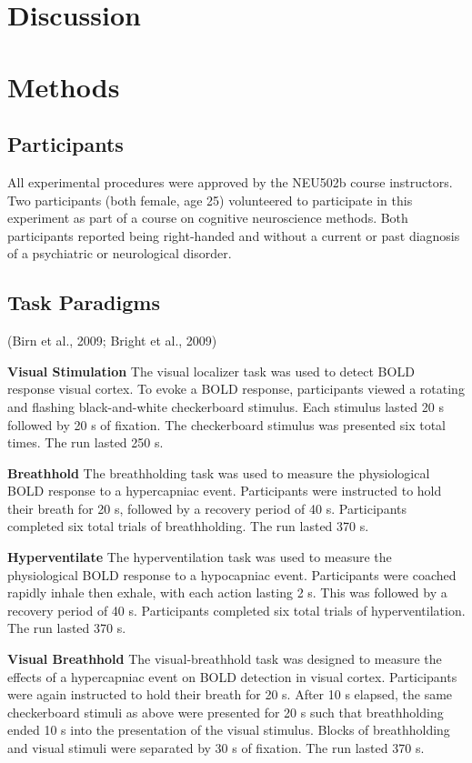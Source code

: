 \documentclass[9pt]{NEU502b-fmri}
\begin{document}
\section{Discussion}

\section{Methods}

\subsection{Participants}
All experimental procedures were approved by the NEU502b course instructors. Two participants (both female, age 25) volunteered to participate in this experiment as part of a course on cognitive neuroscience methods. Both participants reported being right-handed and without a current or past diagnosis of a psychiatric or neurological disorder.

\subsection{Task Paradigms}
(Birn et al., 2009; Bright et al., 2009) 

\textbf{Visual Stimulation} The visual localizer task was used to detect BOLD response visual cortex. To evoke a BOLD response, participants viewed a rotating and flashing black-and-white checkerboard stimulus. Each stimulus lasted 20 s followed by 20 s of fixation. The checkerboard stimulus was presented six total times. The run lasted 250 s.

\textbf{Breathhold} The breathholding task was used to measure the physiological BOLD response to a hypercapniac event. Participants were instructed to hold their breath for 20 s, followed by a recovery period of 40 s. Participants completed six total trials of breathholding. The run lasted 370 s.

\textbf{Hyperventilate} The hyperventilation task was used to measure the physiological BOLD response to a hypocapniac event. Participants were coached rapidly inhale then exhale, with each action lasting 2 s. This was followed by a recovery period of 40 s. Participants completed six total trials of hyperventilation. The run lasted 370 s.

\textbf{Visual Breathhold} The visual-breathhold task was designed to measure the effects of a hypercapniac event on BOLD detection in visual cortex. Participants were again instructed to hold their breath for 20 s. After 10 s elapsed, the same checkerboard stimuli as above were presented for 20 s such that breathholding ended 10 s into the presentation of the visual stimulus. Blocks of breathholding and visual stimuli were separated by 30 s of fixation. The run lasted 370 s.
\end{document}
